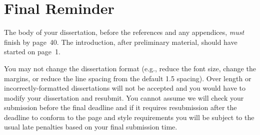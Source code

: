 \documentclass[msc,deptreport.inf]{infthesis} %
\begin{document}
\section{Final Reminder}

The body of your dissertation, before the references and any appendices,
\emph{must} finish by page~40. The introduction, after preliminary material,
should have started on page~1.

You may not change the dissertation format (e.g., reduce the font
size, change the margins, or reduce the line spacing from the default
1.5 spacing). Over length or incorrectly-formatted dissertations will
not be accepted and you would have to modify your dissertation and
resubmit.  You cannot assume we will check your submission before the
final deadline and if it requires resubmission after the deadline to
conform to the page and style requirements you will be subject to the
usual late penalties based on your final submission time.




%
%
%
\end{document}
